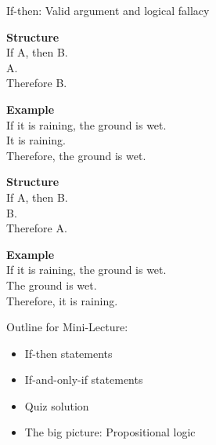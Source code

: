 \documentclass[10pt]{beamer}
\begin{document}
\begin{frame}{If-then: Valid argument and logical fallacy}

\begin{mygreenbox}[title=\textit{Modus Ponens} (A valid argument) \greencheck]
    \begin{minipage}[t]{0.35\linewidth}
    \textbf{Structure} \\
       If A, then B. \\
       A. \\
       Therefore B.
    \end{minipage}\hfill
    \begin{minipage}[t]{0.60\linewidth}
    \textbf{Example} \\
       If it is raining, the ground is wet. \\
       It is raining. \\
       Therefore, the ground is wet.
    \end{minipage}
\end{mygreenbox}

\vspace{0.5cm}
\pause 

\begin{myredbox}[title=\textit{Affirming the Consequent} (A logical fallacy) \redx]
    \begin{minipage}[t]{0.35\linewidth}
    \textbf{Structure} \\
       If A, then B. \\
       B. \\
       Therefore A.
    \end{minipage}\hfill
     \begin{minipage}[t]{0.60\linewidth}
    \textbf{Example} \\
       If it is raining, the ground is wet. \\
       The ground is wet. \\
       Therefore, it is raining.
    \end{minipage}
\end{myredbox}

\end{frame}



\begin{frame}[standout]
Outline for Mini-Lecture:
\begin{itemize}
\item \textbullet \quad If-then statements
\item \alert{\textbullet \quad If-and-only-if statements}
\item \textbullet \quad Quiz solution
\item \textbullet \quad The big picture: Propositional logic
\end{itemize}

\end{frame}
\end{document}
